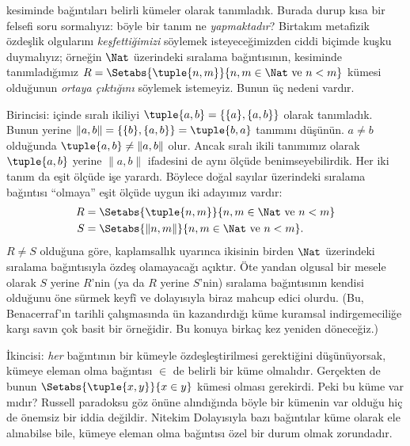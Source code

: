 \documentclass[../../../include/open-logic-section]{subfiles}
\begin{document}

 kesiminde bağıntıları belirli kümeler olarak tanımladık. Burada
durup kısa bir felsefi soru sormalıyız: böyle bir tanım ne \emph{yapmaktadır}?
Birtakım metafizik özdeşlik olgularını \emph{keşfettiğimizi} söylemek
isteyeceğimizden ciddi biçimde kuşku duymalıyız; örneğin $\Nat$ üzerindeki sıralama
bağıntısının,  kesiminde tanımladığımız
$R=\Setabs{\tuple{n,m}}{n, m \in \Nat\text{ ve } n < m}$ kümesi olduğunun
\emph{ortaya çıktığını} söylemek istemeyiz. Bunun üç nedeni vardır.

Birincisi:  içinde sıralı ikiliyi
$\tuple{a, b}=\{\{a\}, \{a, b\}\}$ olarak tanımladık. Bunun yerine
$\lVert a,b\rVert = \{\{b\}, \{a, b\}\}=\tuple{b,a}$ tanımını düşünün.
$a \neq b$ olduğunda $\tuple{a, b} \neq \lVert a,b\rVert$ olur. Ancak sıralı
ikili tanımımız olarak $\tuple{a,b}$ yerine $\lVert a,b\rVert$ ifadesini de
aynı ölçüde benimseyebilirdik. Her iki tanım da eşit ölçüde işe yarardı. Böylece
doğal sayılar üzerindeki sıralama bağıntısı ``olmaya'' eşit ölçüde uygun iki
adayımız vardır:
\begin{align*}
		R &= \Setabs{\tuple{n,m}}{n, m \in \Nat \text{ ve }n < m}\\
		S &= \Setabs{\lVert n,m\rVert}{n, m \in \Nat \text{ ve }n < m}.
\end{align*}
$R \neq S$ olduğuna göre, kaplamsallık uyarınca ikisinin birden $\Nat$ üzerindeki
sıralama bağıntısıyla özdeş olamayacağı açıktır. Öte yandan olgusal bir mesele
olarak $S$ yerine $R$'nin (ya da $R$ yerine $S$'nin) sıralama bağıntısının kendisi olduğunu
öne sürmek keyfî ve dolayısıyla biraz mahcup edici olurdu. (Bu, Benacerraf'ın
\citeyear{Benacerraf1965} tarihli çalışmasında ün kazandırdığı küme kuramsal
indirgemeciliğe karşı savın çok basit bir örneğidir. Bu konuya birkaç kez
yeniden döneceğiz.)

İkincisi: \emph{her} bağıntının bir kümeyle özdeşleştirilmesi gerektiğini
düşünüyorsak, kümeye eleman olma bağıntısı $\in$ de belirli bir küme olmalıdır.
Gerçekten de bunun $\Setabs{\tuple{x,y}}{x \in y}$ kümesi olması gerekirdi.
Peki bu küme var mıdır? Russell paradoksu göz önüne alındığında böyle bir
kümenin var olduğu hiç de önemsiz bir iddia değildir. Nitekim
 Dolayısıyla bazı bağıntılar küme olarak ele
alınabilse bile, kümeye eleman olma bağıntısı özel bir durum olmak zorundadır.
\end{document}
